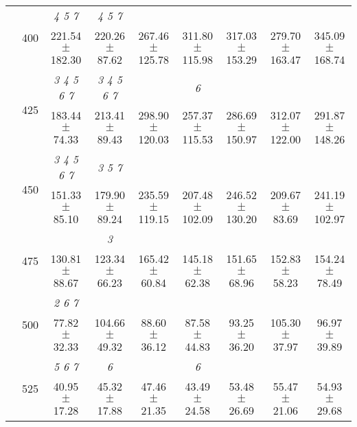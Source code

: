 \begin{table}[h]
{\begin{tabular}{
        ccccccccc}
 & \multirow{2}{*}{400}& \textit{ 4 5 7 }& \textit{ 4 5 7 }& & & & &  \\ 
 & & 221.54 $\pm$ 182.30& 220.26 $\pm$ 87.62& 267.46 $\pm$ 125.78& 311.80 $\pm$ 115.98& 317.03 $\pm$ 153.29& 279.70 $\pm$ 163.47& 345.09 $\pm$ 168.74 \\ 
 & \multirow{2}{*}{425}& \cellcolor[HTML]{EFEFEF} \textit{ 3 4 5 6 7 }& \cellcolor[HTML]{EFEFEF} \textit{ 3 4 5 6 7 }& \cellcolor[HTML]{EFEFEF} & \cellcolor[HTML]{EFEFEF} \textit{ 6 }& \cellcolor[HTML]{EFEFEF} & \cellcolor[HTML]{EFEFEF} & \cellcolor[HTML]{EFEFEF}  \\ 
 & & \cellcolor[HTML]{EFEFEF} 183.44 $\pm$ 74.33& \cellcolor[HTML]{EFEFEF} 213.41 $\pm$ 89.43& \cellcolor[HTML]{EFEFEF} 298.90 $\pm$ 120.03& \cellcolor[HTML]{EFEFEF} 257.37 $\pm$ 115.53& \cellcolor[HTML]{EFEFEF} 286.69 $\pm$ 150.97& \cellcolor[HTML]{EFEFEF} 312.07 $\pm$ 122.00& \cellcolor[HTML]{EFEFEF} 291.87 $\pm$ 148.26 \\ 
 & \multirow{2}{*}{450}& \textit{ 3 4 5 6 7 }& \textit{ 3 5 7 }& & & & &  \\ 
 & & 151.33 $\pm$ 85.10& 179.90 $\pm$ 89.24& 235.59 $\pm$ 119.15& 207.48 $\pm$ 102.09& 246.52 $\pm$ 130.20& 209.67 $\pm$ 83.69& 241.19 $\pm$ 102.97 \\ 
 & \multirow{2}{*}{475}& \cellcolor[HTML]{EFEFEF} & \cellcolor[HTML]{EFEFEF} \textit{ 3 }& \cellcolor[HTML]{EFEFEF} & \cellcolor[HTML]{EFEFEF} & \cellcolor[HTML]{EFEFEF} & \cellcolor[HTML]{EFEFEF} & \cellcolor[HTML]{EFEFEF}  \\ 
 & & \cellcolor[HTML]{EFEFEF} 130.81 $\pm$ 88.67& \cellcolor[HTML]{EFEFEF} 123.34 $\pm$ 66.23& \cellcolor[HTML]{EFEFEF} 165.42 $\pm$ 60.84& \cellcolor[HTML]{EFEFEF} 145.18 $\pm$ 62.38& \cellcolor[HTML]{EFEFEF} 151.65 $\pm$ 68.96& \cellcolor[HTML]{EFEFEF} 152.83 $\pm$ 58.23& \cellcolor[HTML]{EFEFEF} 154.24 $\pm$ 78.49 \\ 
 & \multirow{2}{*}{500}& \textit{ 2 6 7 }& & & & & &  \\ 
 & & 77.82 $\pm$ 32.33& 104.66 $\pm$ 49.32& 88.60 $\pm$ 36.12& 87.58 $\pm$ 44.83& 93.25 $\pm$ 36.20& 105.30 $\pm$ 37.97& 96.97 $\pm$ 39.89 \\ 
 & \multirow{2}{*}{525}& \cellcolor[HTML]{EFEFEF} \textit{ 5 6 7 }& \cellcolor[HTML]{EFEFEF} \textit{ 6 }& \cellcolor[HTML]{EFEFEF} & \cellcolor[HTML]{EFEFEF} \textit{ 6 }& \cellcolor[HTML]{EFEFEF} & \cellcolor[HTML]{EFEFEF} & \cellcolor[HTML]{EFEFEF}  \\ 
 & & \cellcolor[HTML]{EFEFEF} 40.95 $\pm$ 17.28& \cellcolor[HTML]{EFEFEF} 45.32 $\pm$ 17.88& \cellcolor[HTML]{EFEFEF} 47.46 $\pm$ 21.35& \cellcolor[HTML]{EFEFEF} 43.49 $\pm$ 24.58& \cellcolor[HTML]{EFEFEF} 53.48 $\pm$ 26.69& \cellcolor[HTML]{EFEFEF} 55.47 $\pm$ 21.06& \cellcolor[HTML]{EFEFEF} 54.93 $\pm$ 29.68 \\ 

\end{tabular}}
\end{table}
